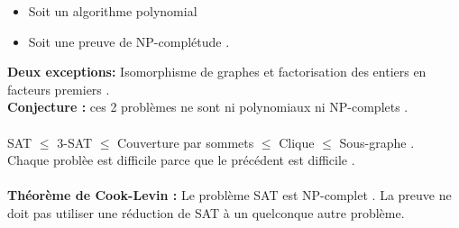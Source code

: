 \documentclass[base.tex]{subfiles}
\begin{document}
\begin{itemize}
\item Soit un algorithme polynomial
  \item Soit une preuve de NP-complétude .
\end{itemize}
\textbf{Deux exceptions: } Isomorphisme de graphes et factorisation des entiers en facteurs premiers .\\
\textbf{Conjecture : } ces 2 problèmes ne sont ni polynomiaux ni NP-complets .\\
\\
SAT $\leq$ 3-SAT $\leq$ Couverture par sommets $\leq$ Clique $\leq$ Sous-graphe .\\
Chaque problèe est difficile parce que le précédent est difficile .\\
\\
\textbf{Théorème de Cook-Levin : } Le problème SAT est NP-complet . La preuve ne doit pas utiliser une réduction de SAT à un quelconque autre problème.\\
\end{document}
